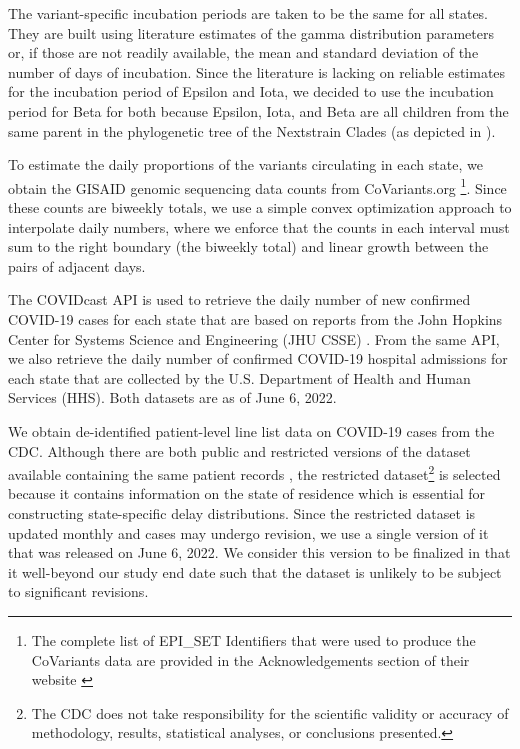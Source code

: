 \documentclass{article}
\begin{document}
The variant-specific incubation periods are taken to be the same for all states.
They are built using literature estimates of the gamma distribution parameters
or, if those are not readily available, the mean and standard deviation of the
number of days of incubation. Since the literature is lacking on reliable
estimates for the incubation period of Epsilon and Iota, we decided to use the
incubation period for Beta for both because Epsilon, Iota, and Beta are all
children from the same parent in the phylogenetic tree of the Nextstrain Clades
(as depicted in \citet{hodcroft2021covariants}).

To estimate the daily proportions of the variants circulating in each state, we
obtain the GISAID genomic sequencing data counts from CoVariants.org
\citep{hodcroft2021covariants, elbe2017data}\footnote{The complete list of
EPI\_SET Identifiers that were used to produce the CoVariants data are provided
in the Acknowledgements section of their website
\citep{hodcroft2021covariants}}. Since these counts are biweekly totals, we use
a simple convex optimization approach to interpolate daily numbers, where we
enforce that the counts in each interval must sum to the right boundary (the
biweekly total) and linear growth between the pairs of adjacent days. 

The COVIDcast API \citep{reinhart2021open} is used to retrieve the daily number
of new confirmed COVID-19 cases for each state that are based on reports from
the John Hopkins Center for Systems Science and Engineering (JHU CSSE)
\citep{dong2020interactive}. From the same API, we also retrieve the daily
number of confirmed COVID-19 hospital admissions for each state that are
collected by the U.S. Department of Health and Human Services (HHS). Both
datasets are as of June 6, 2022.

We obtain de-identified patient-level line list data on COVID-19 cases from the
CDC. Although there are both public and restricted versions of the dataset
available containing the same patient records \citep{cdc2020casepub,
cdc2020caserestr}, the restricted dataset\footnote{The CDC does not take
responsibility for the scientific validity or accuracy of methodology, results,
statistical analyses, or conclusions presented.} is selected because it contains
information on the state of residence which is essential for constructing
state-specific delay distributions. Since the restricted dataset is updated
monthly and cases may undergo revision, we use a single version of it that was
released on June 6, 2022. We consider this version to be finalized in that it
well-beyond our study end date such that the dataset is unlikely to be subject
to significant revisions.
\end{document}
